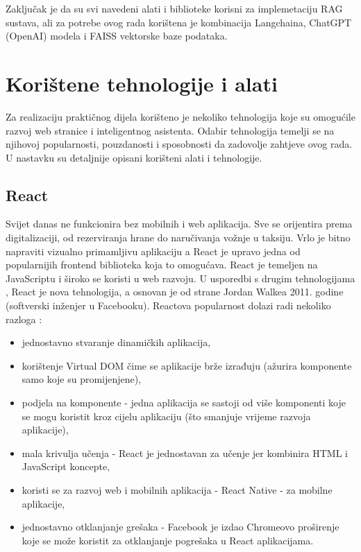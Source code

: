 \documentclass[]{foi}
\begin{document}
Zaključak je da su svi navedeni alati i biblioteke korisni za implemetaciju RAG sustava, ali za potrebe ovog rada korištena je kombinacija
Langchaina, ChatGPT (OpenAI) modela i FAISS vektorske baze podataka. 


\chapter{Korištene tehnologije i alati}
Za realizaciju praktičnog dijela korišteno je nekoliko tehnologija koje su omogućile razvoj web stranice i inteligentnog asistenta. 
Odabir tehnologija temelji se na njihovoj popularnosti, pouzdanosti i sposobnosti da zadovolje zahtjeve ovog rada. U nastavku su detaljnije
opisani korišteni alati i tehnologije.

\section{React}

Svijet danas ne funkcionira bez mobilnih i web aplikacija. Sve se orijentira prema digitalizaciji, od rezerviranja hrane do naručivanja vožnje u taksiju. Vrlo je bitno napraviti vizualno
primamljivu aplikaciju a React je upravo jedna od popularnijih frontend biblioteka koja to omogućava. React je temeljen na JavaScriptu i široko se koristi u web razvoju. U usporedbi s drugim tehnologijama
, React je nova tehnologija, a osnovan je od strane Jordan Walkea 2011. godine (softverski inženjer u Facebooku). Reactova popularnost dolazi radi nekoliko razloga \cite{simplilearn2025react}:
\begin{itemize}
    \item jednostavno stvaranje dinamičkih aplikacija,
    \item korištenje Virtual DOM čime se aplikacije brže izrađuju (ažurira komponente samo koje su promijenjene),
    \item podjela na komponente - jedna aplikacija se sastoji od više komponenti koje se mogu koristit kroz cijelu aplikaciju (što smanjuje vrijeme razvoja aplikacije),
    \item mala krivulja učenja - React je jednostavan za učenje jer kombinira HTML i JavaScript koncepte,
    \item koristi se za razvoj web i mobilnih aplikacija - React Native - za mobilne aplikacije,
    \item jednostavno otklanjanje grešaka - Facebook je izdao Chromeovo proširenje koje se može koristit za otklanjanje pogrešaka u React aplikacijama.
\end{itemize}
\end{document}
